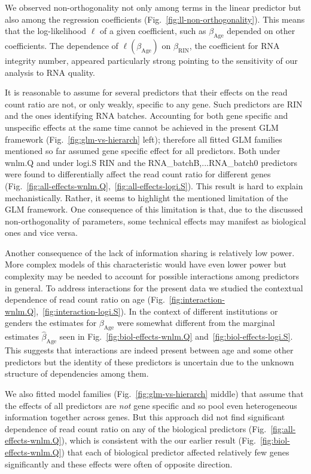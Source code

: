 \documentclass[12pt,letterpaper]{article}
\begin{document}
We observed non-orthogonality not only among terms in the linear predictor but
also among the regression coefficients (Fig.~\ref{fig:ll-non-orthogonality}).
This means that the log-likelihood \(\ell\) of a given coefficient, such as
\(\beta_\mathrm{Age}\) depended on other coefficients.  The dependence of
\(\ell(\beta_\mathrm{Age})\) on \(\beta_\mathrm{RIN}\), the coefficient for
RNA integrity number, appeared particularly strong pointing to the sensitivity
of our analysis to RNA quality.

It is reasonable to assume for several predictors that their effects on the
read count ratio are not, or only weakly, specific to any gene.  Such predictors are RIN
and the ones identifying RNA batches.  Accounting for both gene specific and
unspecific effects at the same time cannot be achieved in the present GLM
framework (Fig.~\ref{fig:glm-vs-hierarch} left); therefore all fitted GLM
families mentioned so far assumed gene specific effect for all predictors.
Both under wnlm.Q and under logi.S RIN and the RNA\_batchB,...RNA\_batch0
predictors were found to differentially affect the read count ratio for
different genes
(Fig.~\ref{fig:all-effects-wnlm.Q},~\ref{fig:all-effects-logi.S}).  This result
is hard to explain mechanistically.  Rather, it seems to highlight the
mentioned limitation of the GLM framework.  One consequence of this limitation
is that, due to the discussed non-orthogonality of parameters, some technical
effects may manifest as biological ones and vice versa.

Another consequence of the lack of information sharing is relatively low
power.  More complex models of this characteristic would have even lower power
but complexity may be needed to account for possible interactions among predictors in
general.  To address interactions for the present data we studied the contextual
dependence of read count ratio on age
(Fig.~\ref{fig:interaction-wnlm.Q},~\ref{fig:interaction-logi.S}).  In the
context of different institutions or genders the estimates for
\(\beta_\mathrm{Age}\) were somewhat different from the marginal estimates
\(\hat\beta_\mathrm{Age}\) seen in Fig.~\ref{fig:biol-effects-wnlm.Q}
and~\ref{fig:biol-effects-logi.S}.  This suggests that interactions are indeed
present between age and some other predictors but the identity of these
predictors is uncertain due to the unknown structure of dependencies among them.

We also fitted model families (Fig.~\ref{fig:glm-vs-hierarch} middle) that
assume that the effects of all predictors are \emph{not} gene specific and so
pool even heterogeneous information together across genes.  But this approach
did not find significant dependence of read count ratio on any of the
biological predictors (Fig.~\ref{fig:all-effects-wnlm.Q}), which is consistent
with the our earlier result (Fig.~\ref{fig:biol-effects-wnlm.Q}) that each of
biological predictor affected relatively few genes significantly and these
effects were often of opposite direction.
\end{document}
